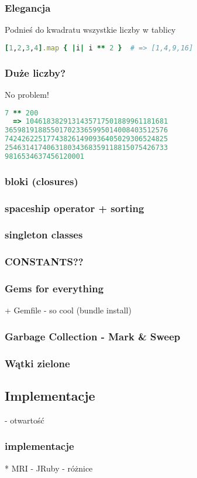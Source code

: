 \begin{frame}[fragile]
\frametitle{Elegancja}
\begin{block}{Podnieś do kwadratu wszystkie liczby w tablicy}
\begin{lstlisting}[language=Ruby]
[1,2,3,4].map { |i| i ** 2 }  # => [1,4,9,16]
\end{lstlisting}
\end{block}
\end{frame}

\begin{frame}[fragile]
\frametitle{Duże liczby?}
\begin{block}{No problem!}
\begin{lstlisting}[language=Ruby]
7 ** 200
  => 1046183829131435717501889961181681
365981918855017023365995014008403512576
742426225177438261490936405029306524825
254631417406318034368359118815075426733
9816534637456120001
\end{lstlisting}
\end{block}
\end{frame}




\begin{frame}[fragile]
\frametitle{bloki (closures)}
\end{frame}

\begin{frame}[fragile]
\frametitle{spaceship operator + sorting}
\end{frame}

\begin{frame}[fragile]
\frametitle{singleton classes}
\end{frame}

\begin{frame}[fragile]
\frametitle{CONSTANTS??}
\end{frame}

\begin{frame}[fragile]
\frametitle{Gems for everything}
 + Gemfile - so cool (bundle install)
\end{frame}

\begin{frame}[fragile]
\frametitle{Garbage Collection - Mark \& Sweep}
\end{frame}

\begin{frame}[fragile]
\frametitle{Wątki zielone}
\end{frame}
\subsection{Implementacje}
 - otwartość

\begin{frame}[fragile]
\frametitle{implementacje}
    * MRI
    - JRuby - różnice
\end{frame}
